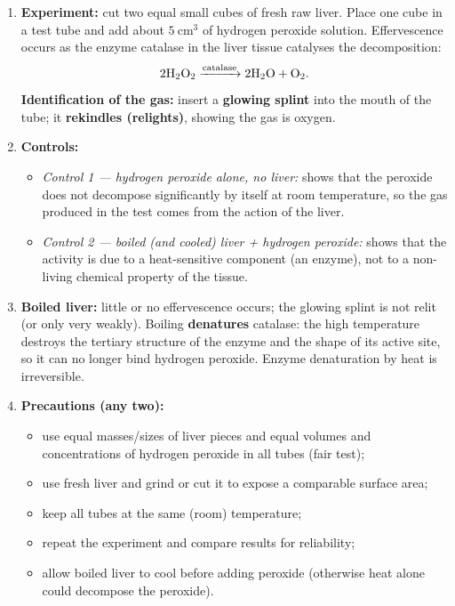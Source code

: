 \documentclass[11pt]{article}
\newcommand{\cle}[1]{{\popxbold\color{popdark}#1}}
\begin{document}
\begin{corrige}
\begin{enumerate}
\item \textbf{Experiment:} cut two equal small cubes of fresh raw liver. Place one cube in a test tube and add about $5\ \mathrm{cm^3}$ of hydrogen peroxide solution. Effervescence occurs as the enzyme \cle{catalase} in the liver tissue catalyses the decomposition:
\[ 2\ce{H2O2} \xrightarrow{\text{catalase}} 2\ce{H2O} + \ce{O2}. \]
\textbf{Identification of the gas:} insert a \textbf{glowing splint} into the mouth of the tube; it \textbf{rekindles (relights)}, showing the gas is oxygen.
\item \textbf{Controls:}
\begin{itemize}
\item \emph{Control 1 — hydrogen peroxide alone, no liver:} shows that the peroxide does not decompose significantly by itself at room temperature, so the gas produced in the test comes from the action of the liver.
\item \emph{Control 2 — boiled (and cooled) liver + hydrogen peroxide:} shows that the activity is due to a heat-sensitive component (an enzyme), not to a non-living chemical property of the tissue.
\end{itemize}
\item \textbf{Boiled liver:} little or no effervescence occurs; the glowing splint is not relit (or only very weakly). Boiling \textbf{denatures} catalase: the high temperature destroys the tertiary structure of the enzyme and the shape of its active site, so it can no longer bind hydrogen peroxide. Enzyme denaturation by heat is irreversible.
\item \textbf{Precautions (any two):}
\begin{itemize}
\item use equal masses/sizes of liver pieces and equal volumes and concentrations of hydrogen peroxide in all tubes (fair test);
\item use fresh liver and grind or cut it to expose a comparable surface area;
\item keep all tubes at the same (room) temperature;
\item repeat the experiment and compare results for reliability;
\item allow boiled liver to cool before adding peroxide (otherwise heat alone could decompose the peroxide).
\end{itemize}
\end{enumerate}
\end{corrige}
\end{document}
